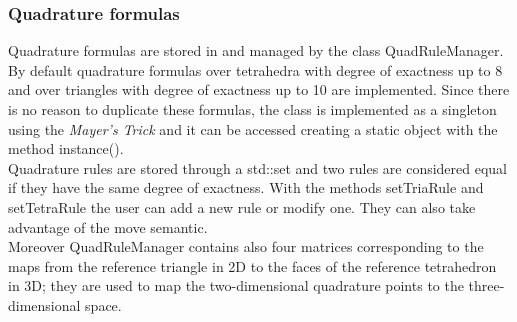 \documentclass[12pt, a4paper]{article}
\newcommand{\code}[1]{{\footnotesize\ttfamily #1}}
\theoremstyle{definition}
\theoremstyle{plain}
\theoremstyle{plain}
\theoremstyle{definition}
\begin{document}
\subsubsection{Quadrature formulas}

Quadrature formulas are stored in and managed by the class \code{QuadRuleManager}. By default quadrature formulas over tetrahedra with degree of exactness up to 8 and over triangles with degree of exactness up to 10 are implemented. Since there is no reason to duplicate these formulas, the class is implemented as a singleton using the \emph{Mayer's Trick} and it can be accessed creating a static object with the method \code{instance()}.\\
Quadrature rules are stored through a \code{std::set} and two rules are 
considered equal if they have the same degree of exactness. With the methods 
\code{setTriaRule} and \code{setTetraRule} the user can add a new rule or 
modify one. They can also take advantage of the move semantic.\\
Moreover \code{QuadRuleManager} contains also four matrices corresponding to the maps from the reference triangle in 2D to the faces of the reference tetrahedron in 3D; they are used to map the two-dimensional quadrature points to the three-dimensional space.\\
\end{document}
